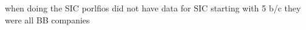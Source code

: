 when doing the SIC porlfios did not have data for SIC starting with 5 b/c they were all BB companies 
